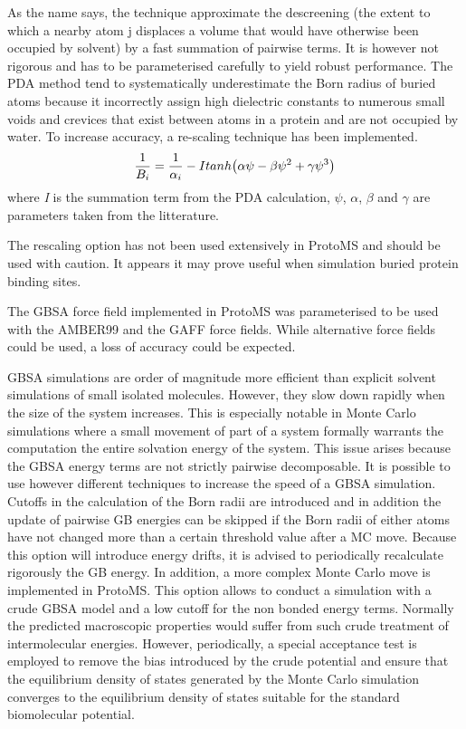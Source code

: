 \documentclass[letterpaper,10pt,english]{manual}
\begin{document}
As the name says, the technique approximate the descreening (the extent to which a nearby atom j displaces a volume that would have otherwise been occupied by solvent) by a fast summation of pairwise terms. It is however not rigorous and has to be parameterised carefully to yield robust performance. The PDA method tend to systematically underestimate the Born radius of buried atoms because it incorrectly assign high dielectric constants to numerous small voids and crevices that exist between atoms in a protein and are not occupied by water. To increase accuracy, a re-scaling technique has been implemented.
\begin{gather}
\begin{split}{\frac{1}{B_i}}  = \frac{1}{\alpha _{i}} - Itanh\big( \alpha \psi - \beta \psi^{2} + \gamma \psi^{3}  \big)\end{split}\notag
\end{gather}
where \emph{I} is the summation term from the PDA calculation, $\psi$, $\alpha$, $\beta$ and $\gamma$ are parameters taken from the litterature.

The rescaling option has not been used extensively in ProtoMS and should be used with caution. It appears it may prove useful when simulation buried protein binding sites.

The GBSA force field implemented in ProtoMS was parameterised to be used with the AMBER99 and the GAFF force fields. While alternative force fields could be used, a loss of accuracy could be expected.

GBSA simulations are order of magnitude more efficient than explicit solvent simulations of small isolated molecules. However, they slow
down rapidly when the size of the system increases. This is especially notable in Monte Carlo simulations where a small movement of part of a system formally warrants the computation the entire solvation energy of the system. This issue arises because the GBSA energy terms are not strictly pairwise decomposable.  It is possible to use however different techniques to increase the speed of a GBSA simulation. Cutoffs in the calculation of the Born radii are introduced and in addition the update of pairwise GB energies can be skipped if the Born radii of either atoms have not changed more than a certain threshold value after a MC move. Because this option will introduce energy drifts, it is advised to periodically recalculate rigorously the GB energy. In addition, a more complex Monte Carlo move is implemented in ProtoMS. This option allows to conduct a simulation with a crude GBSA model and a low cutoff for the non bonded energy terms. Normally the  predicted macroscopic properties would suffer from such crude treatment of intermolecular energies. However, periodically, a special acceptance test is employed to remove the bias introduced by the crude potential and ensure that the equilibrium density of states generated by the Monte Carlo simulation converges to the equilibrium density of states suitable for the standard biomolecular potential.
\end{document}
